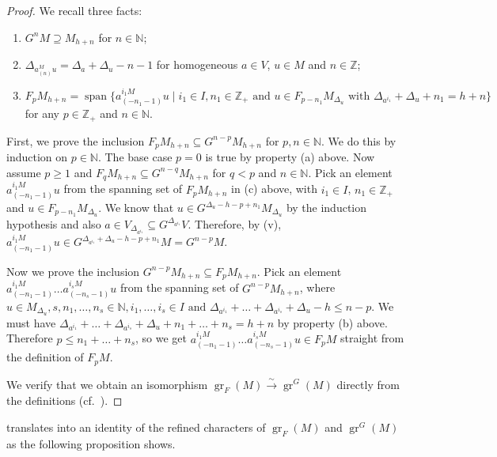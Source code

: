 \documentclass[a4paper, 12pt, reqno]{amsart}
\theoremstyle{remark}
\numberwithin{equation}{subsection}
\DeclareMathOperator{\gr}{gr}
\DeclareMathOperator{\vspan}{span}
\begin{document}
\begin{proof}
  We recall three facts:
  \begin{enumerate}[label = (\alph*)]
  \item $G^nM \supseteq M_{h + n}$ for $n \in \mathbb{N}$;
  \item $\Delta_{a^M_{(n)}u} = \Delta_a + \Delta_u - n - 1$ for homogeneous $a \in V$, $u \in M$ and $n \in \mathbb{Z}$;
  \item $F_pM_{h + n} = \vspan\{a^{i_1M}_{(-n_1 - 1)}u \mid i_1 \in I, n_1 \in \mathbb{Z}_+\text{ and }u \in F_{p - n_1}M_{\Delta_u}\text{ with }\Delta_{a^{i_1}} + \Delta_u + n_1 = h + n\}$ for any $p \in \mathbb{Z}_+$ and $n \in \mathbb{N}$.
  \end{enumerate}
  First, we prove the inclusion $F_pM_{h + n} \subseteq G^{n - p}M_{h + n}$ for $p, n \in \mathbb{N}$.
  We do this by induction on $p \in \mathbb{N}$.
  The base case $p = 0$ is true by property (a) above.
  Now assume $p \ge 1$ and $F_qM_{h + n} \subseteq G^{n - q}M_{h + n}$ for $q < p$ and $n \in \mathbb{N}$.
  Pick an element $a^{i_1M}_{(-n_1 - 1)}u$ from the spanning set of $F_pM_{h + n}$ in (c) above, with $i_1 \in I$, $n_1 \in \mathbb{Z}_+$ and $u \in F_{p - n_1}M_{\Delta_u}$.
  We know that $u \in G^{\Delta_u - h - p + n_1}M_{\Delta_u}$ by the induction hypothesis and also $a \in V_{\Delta_{a^{i_1}}} \subseteq G^{\Delta_{a^{i_1}}}V$.
  Therefore, by (v), $a^{i_1M}_{(-n_1 - 1)}u \in G^{\Delta_{a^{i_1}} + \Delta_u - h - p + n_1}M = G^{n - p}M$.

  Now we prove the inclusion $G^{n - p}M_{h + n} \subseteq F_pM_{h + n}$.
  Pick an element $a^{i_1M}_{(-n_1 - 1)}\dots a^{i_sM}_{(-n_s - 1)}u$ from the spanning set of $G^{n - p}M_{h + n}$, where $u \in M_{\Delta_u}, s, n_1, \dots, n_s \in \mathbb{N}, i_1, \dots, i_s \in I\text{ and }\Delta_{a^{i_1}} + \dots + \Delta_{a^{i_s}} + \Delta_u - h \le n - p$.
  We must have $\Delta_{a^{i_1}} + \dots + \Delta_{a^{i_s}} + \Delta_u + n_1 + \dots + n_s = h + n$ by property (b) above.
  Therefore $p \le n_1 + \dots + n_s$, so we get $a^{i_1M}_{(-n_1 - 1)}\dots a^{i_sM}_{(-n_s - 1)}u \in F_pM$ straight from the definition of $F_pM$.

  We verify that we obtain an isomorphism $\gr_F(M) \xrightarrow{\sim} \gr^G(M)$ directly from the definitions (cf.\ ).
\end{proof}

 translates into an identity of the refined characters of $\gr_F(M)$ and $\gr^G(M)$ as the following proposition shows.
\end{document}
